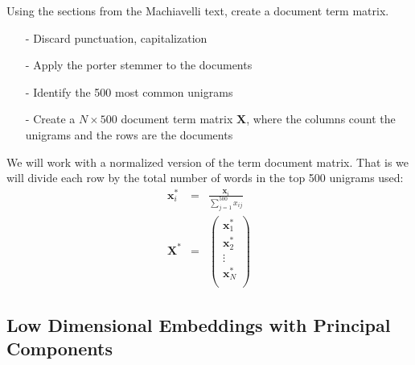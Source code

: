\documentclass[12pt,letterpaper]{article}
\begin{document}
Using the sections from the Machiavelli text, create a document term matrix.
\begin{itemize}
\item[-] Discard punctuation, capitalization
\item[-] Apply the porter stemmer to the documents
\item[-] Identify the 500 most common unigrams
\item[-] Create a $N \times 500$ document term matrix $\boldsymbol{X}$, where the columns count the unigrams and the rows are the documents
\end{itemize}


We will work with a normalized version of the term document matrix.  That is we will divide each row by the total number of words in the top 500 unigrams used:
\begin{eqnarray}
\boldsymbol{x}_{i}^{*} & = & \frac{\boldsymbol{x}_{i}}{\sum_{j=1}^{500} x_{ij}} \nonumber\\
\boldsymbol{X}^{*} & = & \begin{pmatrix} \boldsymbol{x}_{1}^{*} \\
\boldsymbol{x}_{2}^{*} \\
\vdots \\
\boldsymbol{x}_{N}^{*} \\
  \end{pmatrix}  \nonumber
\end{eqnarray}




\subsection*{Low Dimensional Embeddings with Principal Components}
\end{document}
